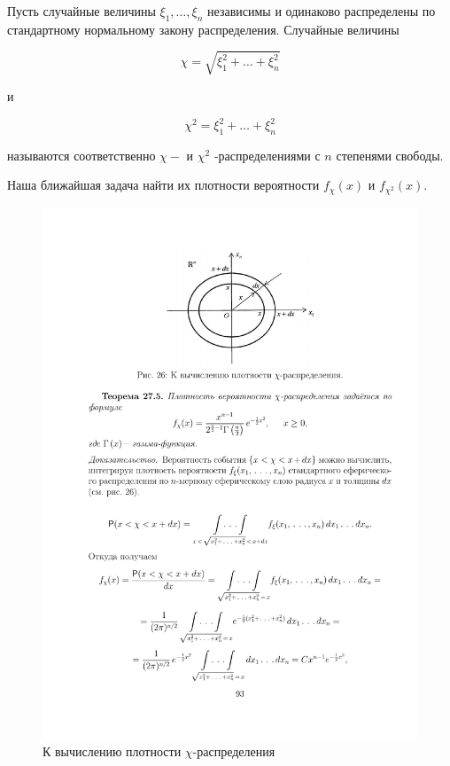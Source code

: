 \begin{definition}
\label{def:27.4}
Пусть случайные величины $\xi_1 , \ldots , \xi_n$ независимы и одинаково распределены по стандартному нормальному закону распределения. Случайные величины

$$\chi = \sqrt{\xi_1^2 +\ldots + \xi_n^2 }$$

и

$$\chi^2 = \xi_1^2 + \ldots + \xi_n^2$$

называются соответственно $\chi-$ и $\chi^2$ -распределениями с $n$ степенями свободы.

Наша ближайшая задача найти их плотности вероятности $f_{\chi} (x)$ и $f_{\chi^2} (x)$.
\end{definition}

\begin{figure}[H]
	\centering
	\includegraphics[]{pic/pic26}
	\caption{К вычислению плотности $\chi$-распределения}
	\label{fig26}
\end{figure}

